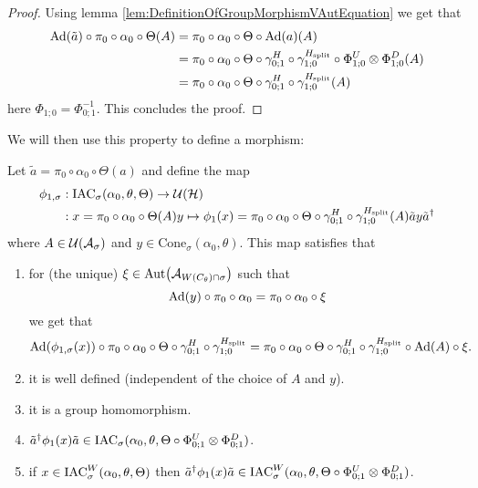 \documentclass[11pt,a4paper,twoside]{article}
\numberwithin{equation}{section}
\begin{document}
\begin{proof}
	Using lemma \ref{lem:DefinitionOfGroupMorphismVAutEquation} we get that
	\begin{align}
		\Ad{\tilde{a}}\circ\pi_0\circ\alpha_0\circ\Theta(A)&=\pi_0\circ\alpha_0\circ\Theta\circ\Ad{a}(A)\\
		&=\pi_0\circ\alpha_0\circ\Theta\circ\gamma^H_{0;1}\circ\gamma^{\Hsplit}_{1;0}\circ\Phi^U_{1;0}\otimes\Phi^D_{1;0}(A)\\
		&=\pi_0\circ\alpha_0\circ\Theta\circ\gamma^H_{0;1}\circ\gamma^{\Hsplit}_{1;0}(A)
	\end{align}
here $\Phi_{1;0}=\Phi_{0;1}^{-1}$. This concludes the proof.
\end{proof}
We will then use this property to define a morphism:
\begin{lemma}\label{lem:DefinitionOfGroupMorphism}
	Let $\tilde{a}=\pi_0\circ\alpha_0\circ\Theta(a)$ and define the map
	\begin{align}
		\phi_{1,\sigma}&:\textrm{IAC}_\sigma(\alpha_0,\theta,\Theta) \rightarrow \mathcal U(\mathcal H)\\
		\nonumber
		&:x=\pi_0\circ\alpha_0\circ\Theta(A)y\mapsto \phi_1(x)=\pi_0\circ\alpha_0\circ\Theta\circ\gamma^H_{0;1}\circ\gamma^{{H_{\text{split}}}}_{1;0}(A)\tilde{a}y\tilde{a}^\dagger
	\end{align}
	where $A\in\mathcal U(\mathcal A_\sigma)$ and $y\in\textrm{Cone}_\sigma(\alpha_0,\theta)$. This map satisfies that
	\begin{enumerate}
		\item  for (the unique) $\xi\in\Aut{\AA_{W(C_\theta)\cap\sigma}}$ such that
		\begin{equation}
			\Ad{y}\circ\pi_0\circ\alpha_0=\pi_0\circ\alpha_0\circ\xi
		\end{equation}
		we get that
		\begin{equation}\label{eq:ConditionDefinitionOfGroupMorphism}
			\Ad{\phi_{1,\sigma}(x)}\circ\pi_0\circ\alpha_0\circ\Theta\circ\gamma^H_{0;1}\circ\gamma^{\Hsplit}_{1;0}=\pi_0\circ\alpha_0\circ\Theta\circ\gamma^H_{0;1}\circ\gamma^{\Hsplit}_{1;0}\circ\Ad{A}\circ\xi.
		\end{equation}
		\item it is well defined (independent of the choice of $A$ and $y$).
		\item it is a group homomorphism.
		\item $\tilde{a}^\dagger \phi_1(x)\tilde{a}\in\textrm{IAC}_\sigma(\alpha_0,\theta,\Theta\circ \Phi^U_{0;1}\otimes\Phi^D_{0;1})$.
		\item if $x\in \textrm{IAC}_\sigma^W(\alpha_0,\theta,\Theta)$ then  $\tilde{a}^\dagger \phi_1(x)\tilde{a}\in\textrm{IAC}_\sigma^W(\alpha_0,\theta,\Theta\circ \Phi^U_{0;1}\otimes\Phi^D_{0;1})$.
	\end{enumerate}
\end{lemma}
\end{document}
